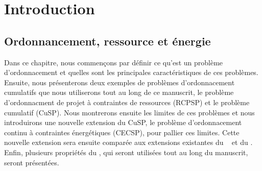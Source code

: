 \cleardoublepage
\begin{minipage}{0.95\linewidth}
  \part{Introduction}
  \vspace{15mm} %
  \parttoc 
\end{minipage}

\chapter{Ordonnancement, ressource et énergie}

Dans ce chapitre, nous commençons par définir ce qu'est un problème
d'ordonnacement et quelles sont les principales caractéristiques de
ces problèmes. Ensuite, nous présenterons deux exemples de problèmes
d'ordonnacement cumulatifs que nous utiliserons tout au long de ce
manuscrit, le problème d'ordonnacment de projet à contraintes de
ressources (RCPSP) et le problème cumulatif (CuSP). Nous montrerons
ensuite les limites de ces problèmes et nous introduirons une nouvelle 
extension du CuSP, le problème d'ordonnacement continu à contraintes
énergétiques (CECSP), pour pallier ces limites. Cette nouvelle
extension sera ensuite comparée aux extensions existantes du \RCPSP~
et du \CUSP.  Enfin, plusieurs propriétés du \CECSP, qui seront
utilisées tout au long du manuscrit, seront présentées.





